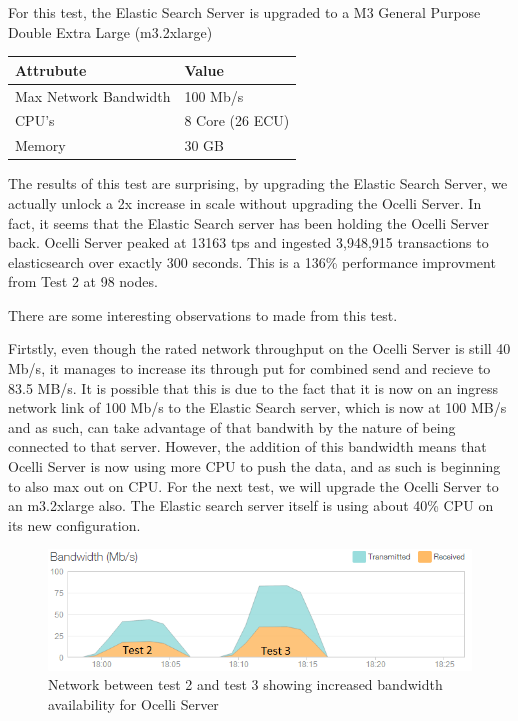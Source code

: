 \documentclass{llncs}
\begin{document}
For this test, the Elastic Search Server is upgraded to a M3 General Purpose Double Extra Large (m3.2xlarge)

\begin{flushleft}
    \begin{tabular}{ | l | l |}
    \hline
  Attrubute & Value  \\ \hline
Max Network Bandwidth &  100 Mb/s	\\ \hline
CPU's &  8 Core (26 ECU)	\\ \hline
Memory &  30 GB	\\ 
    \hline
    \end{tabular}
\end{flushleft}

The results of this test are surprising, by upgrading the Elastic Search Server, we actually unlock a 2x increase in scale without upgrading the Ocelli Server. In fact, it seems that the Elastic Search server has been holding the Ocelli Server back. Ocelli Server peaked at 13163 tps and ingested 3,948,915 transactions to elasticsearch over exactly 300 seconds. This is a 136\% performance improvment from Test 2 at 98 nodes.

There are some interesting observations to made from this test.

Firtstly, even though the rated network throughput on the Ocelli Server is still 40 Mb/s, it manages to increase its through put for combined send and recieve to 83.5 MB/s. It is possible that this is due to the fact that it is now on an ingress network link of 100 Mb/s to the Elastic Search server, which is now at 100 MB/s and as such, can take advantage of that bandwith by the nature of being connected to that server. However, the addition of this bandwidth means that Ocelli Server is now using more CPU to push the data, and as such is beginning to also max out on CPU. For the next test, we will upgrade the Ocelli Server to an m3.2xlarge also. The Elastic search server itself is using about 40\% CPU on its new configuration. 

\begin{figure}[h]
    \centering
    \includegraphics[scale=0.7]{app12}
    \caption{Network between test 2 and test 3 showing increased bandwidth availability for Ocelli Server}
    \label{fig:ocelli_dm}
\end{figure}
\end{document}
